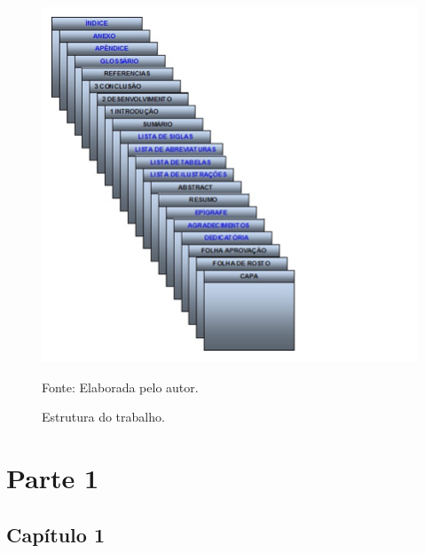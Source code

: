\documentclass[
	12pt,				%
	openright,			%
	twoside,			%
	a4paper,			%
	chapter=TITLE,		%
	sumario=abnt-6027-2012,
	english,			%
	brazil				%
	]{UFVJM-abntex2}
\newcommand{\Fonte}[2]{%
\begin{flushleft} 
\vspace{0cm}
\hspace{#1}
    \begin{minipage}{6cm}
   \footnotesize Fonte: #2
    \end{minipage}%
\end{flushleft} 
}
\begin{document}
\begin{figure}[htb!]
	\centering
	\caption{Estrutura do trabalho.}
	\label{fig:fig1}
	\includegraphics[scale=.95]{img_trab/fig1}
	\Fonte{1.cm}{Elaborada pelo autor.}
\end{figure}


%




\part{Parte 1}

\chapter*{Capítulo 1}



\end{document}
